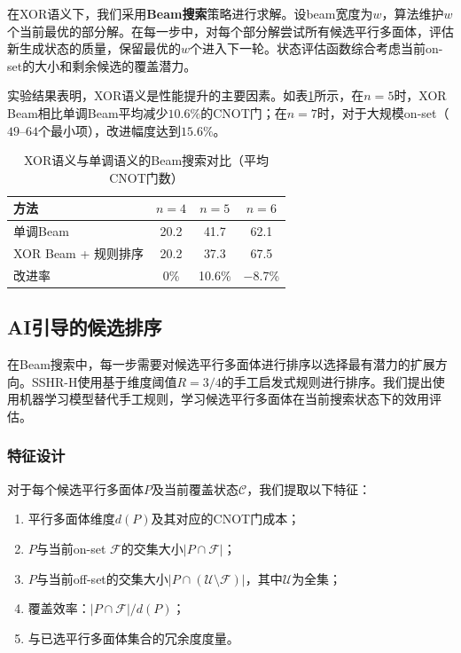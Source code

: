 \documentclass[10.5pt,compsoc,UTF8]{CjC}
\newcommand{\heiti}{\CJKfamily{STHeiti}}
\theoremstyle{mystyle}
\begin{document}
在XOR语义下，我们采用\textbf{Beam搜索}策略\cite{lowerre1976harpy}进行求解。设beam宽度为$w$，算法维护$w$个当前最优的部分解。在每一步中，对每个部分解尝试所有候选平行多面体，评估新生成状态的质量，保留最优的$w$个进入下一轮。状态评估函数综合考虑当前on-set的大小和剩余候选的覆盖潜力。

实验结果表明，XOR语义是性能提升的主要因素。如表\ref{tab:xor-vs-monotone}所示，在$n=5$时，XOR Beam相比单调Beam平均减少$10.6\%$的CNOT门；在$n=7$时，对于大规模on-set（$49$--$64$个最小项），改进幅度达到$15.6\%$。

\begin{table}[H]
  \centering
  \caption{XOR语义与单调语义的Beam搜索对比（平均CNOT门数）}
  \label{tab:xor-vs-monotone}
  \setlength{\tabcolsep}{6pt}
  \begin{tabular}{lccc}
    \toprule
    方法 & $n{=}4$ & $n{=}5$ & $n{=}6$ \\
    \midrule
    单调Beam & 20.2 & 41.7 & 62.1 \\
    XOR Beam + 规则排序 & 20.2 & 37.3 & 67.5 \\
    \midrule
    改进率 & 0\% & 10.6\% & $-$8.7\% \\
    \bottomrule
  \end{tabular}
\end{table}

\subsection{\heiti AI引导的候选排序}
\label{sec:ml-ranker}

在Beam搜索中，每一步需要对候选平行多面体进行排序以选择最有潜力的扩展方向。SSHR-H使用基于维度阈值$R=3/4$的手工启发式规则进行排序。我们提出使用机器学习模型替代手工规则，学习候选平行多面体在当前搜索状态下的效用评估。

\subsubsection*{\heiti 特征设计}

对于每个候选平行多面体$P$及当前覆盖状态$\mathcal{C}$，我们提取以下特征：
\begin{enumerate}
  \item 平行多面体维度$d(P)$及其对应的CNOT门成本；
  \item $P$与当前on-set $\mathcal{F}$的交集大小$|P \cap \mathcal{F}|$；
  \item $P$与当前off-set的交集大小$|P \cap (\mathcal{U}\setminus\mathcal{F})|$，其中$\mathcal{U}$为全集；
  \item 覆盖效率：$|P \cap \mathcal{F}|/d(P)$；
  \item 与已选平行多面体集合的冗余度度量。
\end{enumerate}
\end{document}
